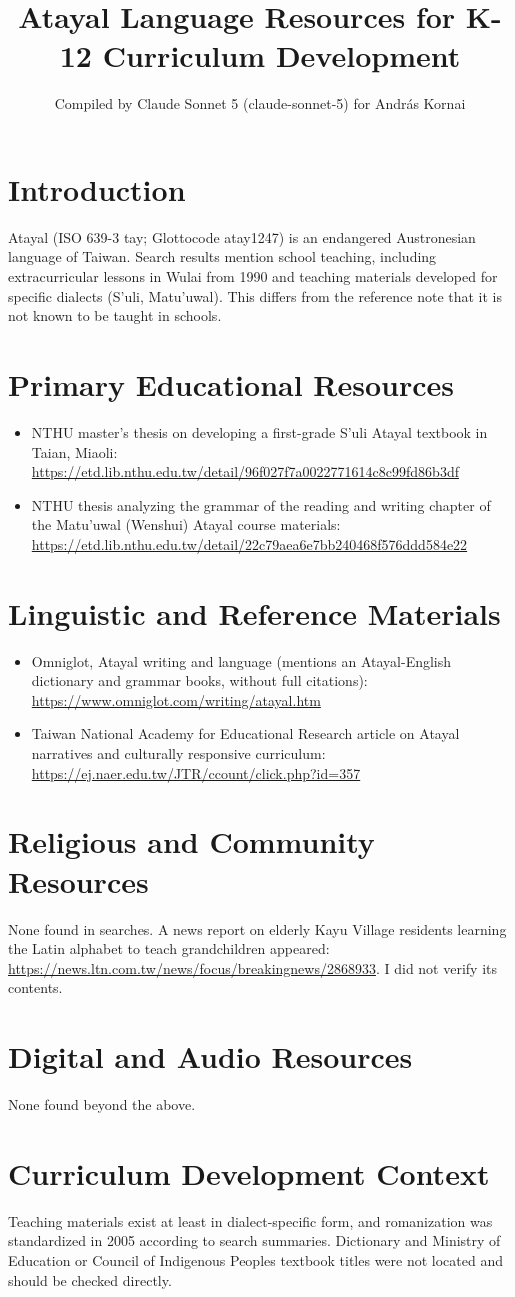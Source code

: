 \documentclass[12pt]{article}
\title{Atayal Language Resources for K-12 Curriculum Development}
\author{Compiled by Claude Sonnet 5 (claude-sonnet-5) for Andr\'as Kornai}
\date{}
\begin{document}
\maketitle
\section{Introduction}
Atayal (ISO 639-3 tay; Glottocode atay1247) is an endangered Austronesian language of Taiwan. Search results mention school teaching, including extracurricular lessons in Wulai from 1990 and teaching materials developed for specific dialects (S'uli, Matu'uwal). This differs from the reference note that it is not known to be taught in schools.
\section{Primary Educational Resources}
\begin{itemize}
\item NTHU master's thesis on developing a first-grade S'uli Atayal textbook in Taian, Miaoli: \url{https://etd.lib.nthu.edu.tw/detail/96f027f7a0022771614c8c99fd86b3df}
\item NTHU thesis analyzing the grammar of the reading and writing chapter of the Matu'uwal (Wenshui) Atayal course materials: \url{https://etd.lib.nthu.edu.tw/detail/22c79aea6e7bb240468f576ddd584e22}
\end{itemize}
\section{Linguistic and Reference Materials}
\begin{itemize}
\item Omniglot, Atayal writing and language (mentions an Atayal-English dictionary and grammar books, without full citations): \url{https://www.omniglot.com/writing/atayal.htm}
\item Taiwan National Academy for Educational Research article on Atayal narratives and culturally responsive curriculum: \url{https://ej.naer.edu.tw/JTR/ccount/click.php?id=357}
\end{itemize}
\section{Religious and Community Resources}
None found in searches. A news report on elderly Kayu Village residents learning the Latin alphabet to teach grandchildren appeared: \url{https://news.ltn.com.tw/news/focus/breakingnews/2868933}. I did not verify its contents.
\section{Digital and Audio Resources}
None found beyond the above.
\section{Curriculum Development Context}
Teaching materials exist at least in dialect-specific form, and romanization was standardized in 2005 according to search summaries. Dictionary and Ministry of Education or Council of Indigenous Peoples textbook titles were not located and should be checked directly.
\end{document}

